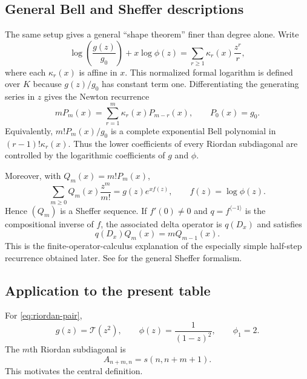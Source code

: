 \documentclass[11pt,oneside]{article}
\theoremstyle{definition}
\theoremstyle{remark}
\newcommand{\TM}{\mathcal T}
\begin{document}
\subsection{General Bell and Sheffer descriptions}

The same setup gives a general ``shape theorem'' finer than degree alone.
Write
\begin{equation}
 \log\!\left(\frac{g(z)}{g_0}\right)+x\log\phi(z)
 =\sum_{r\ge1}\kappa_r(x)\frac{z^r}{r},
 \label{eq:general-cumulants}
\end{equation}
where each $\kappa_r(x)$ is affine in $x$.  This normalized formal logarithm
is defined over $K$ because $g(z)/g_0$ has constant term one.  Differentiating the generating
series in $z$ gives the Newton recurrence
\begin{equation}
 mP_m(x)=\sum_{r=1}^{m}\kappa_r(x)P_{m-r}(x),
 \qquad P_0(x)=g_0.
 \label{eq:general-newton}
\end{equation}
Equivalently, $m!P_m(x)/g_0$ is a complete exponential Bell polynomial in
$(r-1)!\kappa_r(x)$.  Thus the lower coefficients of every Riordan
subdiagonal are controlled by the logarithmic coefficients of $g$ and
$\phi$.

Moreover, with $Q_m(x)=m!P_m(x)$,
\begin{equation}
 \sum_{m\ge0}Q_m(x)\frac{z^m}{m!}
 =g(z)e^{x f(z)},
 \qquad f(z)=\log\phi(z).
 \label{eq:general-sheffer}
\end{equation}
Hence $(Q_m)$ is a Sheffer sequence.  If $f'(0)\ne0$ and $q=f^{\langle-1\rangle}$
is the compositional inverse of $f$, the associated delta operator is
$q(D_x)$ and satisfies
\begin{equation}
 q(D_x)Q_m(x)=mQ_{m-1}(x).
 \label{eq:general-lowering}
\end{equation}
This is the finite-operator-calculus explanation of the especially simple
half-step recurrence obtained later.  See \cite{roman-umbral} for the general
Sheffer formalism.

\subsection{Application to the present table}

For \eqref{eq:riordan-pair},
\[
 g(z)=\TM(z^2),
 \qquad
 \phi(z)=\frac{1}{(1-z)^2},
 \qquad
 \phi_1=2.
\]
The $m$th Riordan subdiagonal is
\begin{equation}
 A_{n+m,n}=s(n,n+m+1).
\end{equation}
This motivates the central definition.
\end{document}
